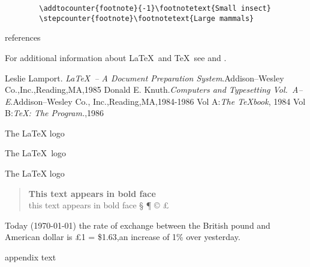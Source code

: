 \documentclass[12pt,twoside,a4paper]{article}   %
\begin{document}
	\begin{verbatim}
		\addtocounter{footnote}{-1}\footnotetext{Small insect}
		\stepcounter{footnote}\footnotetext{Large mammals}
	\end{verbatim}
	\begin{thebibliography}{+} %
		references
	\end{thebibliography}
	\newpage
	For additional information about \LaTeX\ and \TeX\ see \cite{lamport} and \cite{knuth, knuth:a}.
	\begin{thebibliography}{99}
		 Leslie Lamport. \textsl{\LaTeX\ -- A Document Preparation System}.Addison--Wesley Co.,Inc.,Reading,MA,1985
		 Donald E. Knuth.\textsl{Computers and Typesetting Vol.\ A--E}.Addison--Wesley Co., Inc.,Reading,MA,1984-1986
		 Vol A:\textsl{The \TeX book}, 1984
		 Vol B:\textsl{\TeX: The Program.},1986
	\end{thebibliography}
	\newpage
	The \LaTeX{} logo

	The \LaTeX\ logo

	The {\LaTeX} logo

	\begin{quote}
		{\bfseries This text appears in bold face}\\
		\setlength{\parindent}{0.5cm} this text appears in bold face
		\setlength{\textwidth}{12.5cm}
			\S 
			\ddag 
			\P
			\copyright 
			\pounds			
	\end{quote}
	Today (\today) the rate of exchange between the British pound and American dollar is \pounds 1 = \$1.63,an increase of 1\% over yesterday.

	\setlength{\parskip}{1.5ex} %
	\setlength{\parindent}{0em} %
	\renewcommand{\baselinestretch}{2} %
	\setlength{\textwidth}{12.5cm} %
	\begin{appendix}
		appendix text
	\end{appendix}
\end{document}
